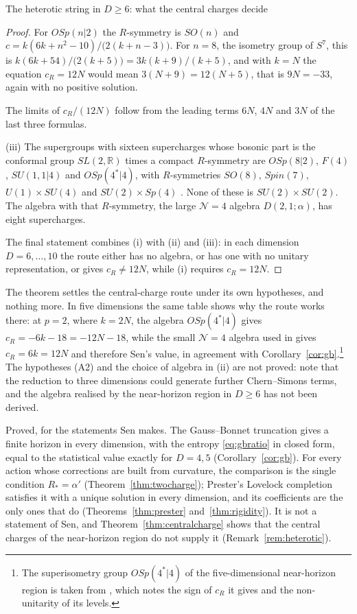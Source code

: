 \begin{closurebox}{The heterotic string in $D\ge6$: what the central charges decide}
\begin{proof}
For $OSp(n|2)$ the $R$-symmetry is $SO(n)$ and $c=k(6k+n^2-10)/\big(2(k+n-3)\big)$. For $n=8$, the isometry group of $S^7$, this is $k(6k+54)/\big(2(k+5)\big)=3k(k+9)/(k+5)$, and with $k=N$ the equation $c_R=12N$ would mean $3(N+9)=12(N+5)$, that is $9N=-33$, again with no positive solution.

The limits of $c_R/(12N)$ follow from the leading terms $6N$, $4N$ and $3N$ of the last three formulas.

(iii) The supergroups with sixteen supercharges whose bosonic part is the conformal group $SL(2,\mathbb R)$ times a compact $R$-symmetry are $OSp(8|2)$, $F(4)$, $SU(1,1|4)$ and $OSp(4^*|4)$, with $R$-symmetries $SO(8)$, $Spin(7)$, $U(1)\times SU(4)$ and $SU(2)\times Sp(4)$ \cite[Table~1]{KLS07}. None of these is $SU(2)\times SU(2)$. The algebra with that $R$-symmetry, the large $\mathcal N=4$ algebra $D(2,1;\alpha)$, has eight supercharges.

The final statement combines (i) with (ii) and (iii): in each dimension $D=6,\dots,10$ the route either has no algebra, or has one with no unitary representation, or gives $c_R\ne12N$, while (i) requires $c_R=12N$.
\end{proof}

The theorem settles the central-charge route under its own hypotheses, and nothing more. In five dimensions the same table shows why the route works there: at $p=2$, where $k=2N$, the algebra $OSp(4^*|4)$ gives $c_R=-6k-18=-12N-18$, while the small $\mathcal N=4$ algebra used in \cite{DM08} gives $c_R=6k=12N$ and therefore Sen's value, in agreement with Corollary~\ref{cor:gb}.\footnote{The superisometry group $OSp(4^*|4)$ of the five-dimensional near-horizon region is taken from \cite{KLS07}, which notes the sign of $c_R$ it gives and the non-unitarity of its levels.} The hypotheses (A2) and the choice of algebra in (ii) are not proved: \cite{KLS07} note that the reduction to three dimensions could generate further Chern--Simons terms, and the algebra realised by the near-horizon region in $D\ge6$ has not been derived. 
\end{closurebox}

\begin{verdict}[claim 26]
Proved, for the statements Sen makes. The Gauss--Bonnet truncation gives a finite horizon in every dimension, with the entropy \eqref{eq:gbratio} in closed form, equal to the statistical value exactly for $D=4,5$ (Corollary~\ref{cor:gb}). For every action whose corrections are built from curvature, the comparison is the single condition $R_*=\alpha'$ (Theorem~\ref{thm:twocharge}); Prester's Lovelock completion satisfies it with a unique solution in every dimension, and its coefficients are the only ones that do (Theorems~\ref{thm:prester} and~\ref{thm:rigidity}).  It is not a statement of Sen, and Theorem~\ref{thm:centralcharge} shows that the central charges of the near-horizon region do not supply it (Remark~\ref{rem:heterotic}).
\end{verdict}
